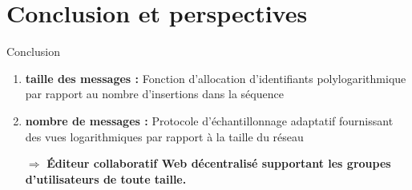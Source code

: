 \section{Conclusion et perspectives}

  



\begin{frame}{Conclusion}

  \begin{enumerate}
  \item \textbf{taille des messages :} Fonction d'allocation d'identifiants
    polylogarithmique par rapport au nombre d'insertions dans la séquence
    \vspace{0.2cm}
  \item \textbf{nombre de messages :} Protocole d'échantillonnage adaptatif
    fournissant des vues logarithmiques par rapport à la taille du réseau
  \end{enumerate}

  \vspace{1cm}
  \large
  \begin{itemize}
  \item [$\Rightarrow$] \textbf{Éditeur collaboratif Web décentralisé supportant les
    groupes d'utilisateurs de toute taille.}
  \end{itemize}

\end{frame}



%       
    

